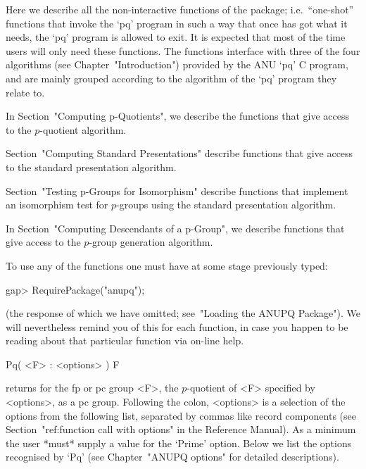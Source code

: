 

Here we describe  all  the  non-interactive  functions  of  the  {\ANUPQ}
package; i.e.~``one-shot'' functions that invoke the `pq' program in  such
a way that once {\GAP} has got what it needs, the `pq' program is  allowed
to exit. It is expected that most of the time users will only need  these
functions. The functions interface with three of the four algorithms (see
Chapter~"Introduction") provided by the  ANU  `pq'  C  program,  and  are
mainly grouped according to the algorithm of the `pq' program they  relate
to.

In Section~"Computing p-Quotients", we describe the functions  that  give
access to the $p$-quotient algorithm.

Section~"Computing Standard Presentations" describe functions  that  give
access to the standard presentation algorithm.

Section~"Testing  p-Groups  for  Isomorphism"  describe  functions   that
implement  an  isomorphism  test  for  $p$-groups  using   the   standard
presentation algorithm.

In Section~"Computing Descendants of a p-Group",  we  describe  functions
that give access to the $p$-group generation algorithm.

To use any of the functions one must have at some stage previously typed:

\beginexample
gap> RequirePackage("anupq");
\endexample

(the response of which we have omitted; see~"Loading the ANUPQ Package").
We will nevertheless remind you of this for each function,  in  case  you
happen to be reading about that particular function via on-line help.


\>Pq( <F> : <options> ) F

returns for the fp or pc group <F>, the $p$-quotient of <F> specified  by
<options>, as a pc group. Following the colon, <options> is  a  selection
of the options from the following list, separated by commas  like  record
components (see Section~"ref:function call with options"  in  the  {\GAP}
Reference Manual). As a minimum the user *must* supply a  value  for  the
`Prime' option. Below  we  list  the  options  recognised  by  `Pq'  (see
Chapter~"ANUPQ options" for detailed descriptions).

